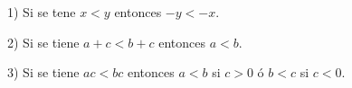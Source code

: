 \begin{frame}

1) Si se tene $x < y $ entonces $-y < -x$.

\hfill

2) Si se tiene $a + c < b + c $ entonces $a < b$.

\hfill

3) Si se tiene $ac < bc$ entonces $a < b$ si $c>0$ ó $b < c$ si $c < 0$.


\end{frame}

